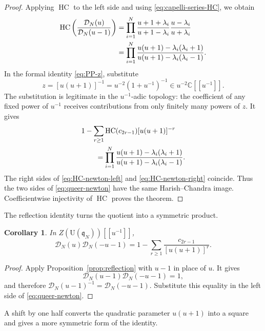 \documentclass[11pt]{amsart}
\numberwithin{equation}{section}
\newtheorem{corollary}[theorem]{Corollary}
\theoremstyle{definition}
\theoremstyle{remark}
\newcommand{\C}{\mathbb C}
\newcommand{\q}{\mathfrak q}
\newcommand{\U}{\mathrm U}
\newcommand{\HC}{\operatorname{HC}}
\newcommand{\calD}{\mathcal D}
\begin{document}
\begin{proof}
Applying \(\HC\) to the left side and using
\eqref{eq:capelli-series-HC}, we obtain
\begin{align}
 \HC\left(\frac{\calD_N(u)}{\calD_N(u-1)}\right)
 &=\prod_{i=1}^N
 \frac{u+1+\lambda_i}{u+1-\lambda_i}
 \frac{u-\lambda_i}{u+\lambda_i}\notag\\
 &=\prod_{i=1}^N
 \frac{u(u+1)-\lambda_i(\lambda_i+1)}
      {u(u+1)-\lambda_i(\lambda_i-1)}.
 \label{eq:HC-newton-left}
\end{align}
In the formal identity \eqref{eq:PP-z}, substitute
\[
 z=[u(u+1)]^{-1}
 =u^{-2}(1+u^{-1})^{-1}\in u^{-2}\C[[u^{-1}]].
\]
The substitution is legitimate in the \(u^{-1}\)-adic topology:
the coefficient of any fixed power of \(u^{-1}\) receives
contributions from only finitely many powers of \(z\).  It gives
\begin{align}
 &1-\sum_{r\geq1}
 \HC(c_{2r-1})[u(u+1)]^{-r}\notag\\
 &\qquad=\prod_{i=1}^N
 \frac{u(u+1)-\lambda_i(\lambda_i+1)}
      {u(u+1)-\lambda_i(\lambda_i-1)}.
 \label{eq:HC-newton-right}
\end{align}
The right sides of \eqref{eq:HC-newton-left} and
\eqref{eq:HC-newton-right} coincide.  Thus the two sides of
\eqref{eq:queer-newton} have the same Harish--Chandra image.
Coefficientwise injectivity of \(\HC\) proves the theorem.
\end{proof}

The reflection identity turns the quotient into a symmetric product.

\begin{corollary}
\label{cor:newton-product}
In \(Z(\U(\q_N))[[u^{-1}]]\),
\begin{equation}
 \boxed{
 \calD_N(u)\calD_N(-u-1)
 =1-\sum_{r\geq1}\frac{c_{2r-1}}{[u(u+1)]^r}.}
 \label{eq:newton-product}
\end{equation}
\end{corollary}

\begin{proof}
Apply Proposition~\ref{prop:reflection} with \(u-1\) in place of
\(u\).  It gives
\[
 \calD_N(u-1)\calD_N(-u-1)=1,
\]
and therefore
\(\calD_N(u-1)^{-1}=\calD_N(-u-1)\).  Substitute this equality in
the left side of \eqref{eq:queer-newton}.
\end{proof}

A shift by one half converts the quadratic parameter \(u(u+1)\) into
a square and gives a more symmetric form of the identity.
\end{document}
